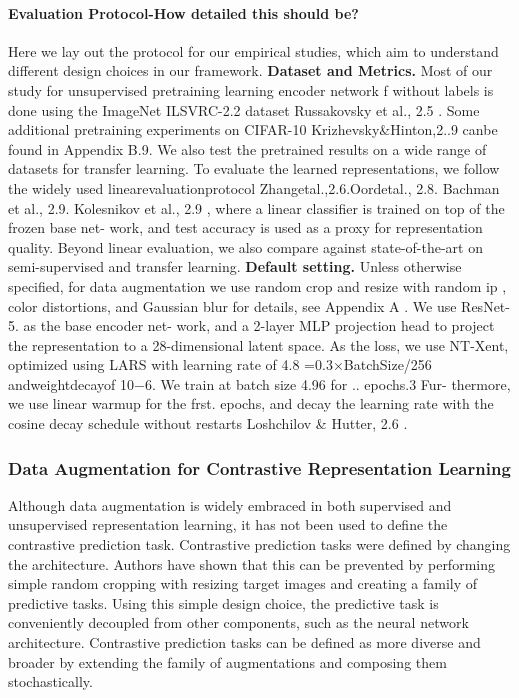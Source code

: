 \documentclass[
]{krantz}
\begin{document}
\hypertarget{evaluation-protocol-how-detailed-this-should-be}{%
\paragraph{Evaluation Protocol-How detailed this should be?}\label{evaluation-protocol-how-detailed-this-should-be}}

Here we lay out the protocol for our empirical studies, which aim to understand different design choices in our framework.
\textbf{Dataset and Metrics.} Most of our study for unsupervised pretraining learning encoder network f without labels is done using the ImageNet ILSVRC-2.2 dataset Russakovsky et al., 2.5 . Some additional pretraining experiments on CIFAR-10 Krizhevsky\&Hinton,2..9 canbe found in Appendix B.9. We also test the pretrained results on a wide range of datasets for transfer learning. To evaluate the learned representations, we follow the widely used linearevaluationprotocol Zhangetal.,2.6.Oordetal., 2.8. Bachman et al., 2.9. Kolesnikov et al., 2.9 , where a linear classifier is trained on top of the frozen base net- work, and test accuracy is used as a proxy for representation quality. Beyond linear evaluation, we also compare against state-of-the-art on semi-supervised and transfer learning.
\textbf{Default setting.} Unless otherwise specified, for data augmentation we use random crop and resize with random ip , color distortions, and Gaussian blur for details, see Appendix A . We use ResNet-5. as the base encoder net- work, and a 2-layer MLP projection head to project the representation to a 28-dimensional latent space. As the loss, we use NT-Xent, optimized using LARS with learning rate of 4.8 =0.3×BatchSize/256 andweightdecayof 10−6. We train at batch size 4.96 for .. epochs.3 Fur- thermore, we use linear warmup for the frst. epochs, and decay the learning rate with the cosine decay schedule without restarts Loshchilov \& Hutter, 2.6 .

\hypertarget{data-augmentation-for-contrastive-representation-learning}{%
\subsubsection{Data Augmentation for Contrastive Representation Learning}\label{data-augmentation-for-contrastive-representation-learning}}

Although data augmentation is widely embraced in both supervised and unsupervised representation learning, it has not been used to define the contrastive prediction task. Contrastive prediction tasks were defined by changing the architecture. Authors have shown that this can be prevented by performing simple random cropping with resizing target images and creating a family of predictive tasks. Using this simple design choice, the predictive task is conveniently decoupled from other components, such as the neural network architecture. Contrastive prediction tasks can be defined as more diverse and broader by extending the family of augmentations and composing them stochastically.
\end{document}
